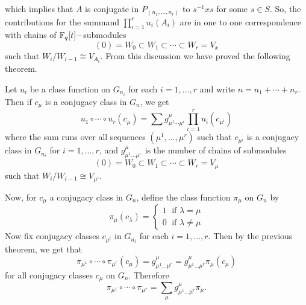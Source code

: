 which implies that $A$ is conjugate in $P_{(n_1,\dots,n_r)}$ to $s^{-1}xs$ for some $s\in S$. So, the contributions for the summand $\prod_{i=1}^ru_i(A_i)$ are in one to one correspondence with chains of $\mathbb{F}_q[t]-$submodules
\begin{equation}
    (0)=W_0\subset W_1\subset\cdots\subset W_r= V_x
\end{equation}
such that $W_i/W_{i-1}\cong V_{A_i}$. From this discussion we have proved the following theorem.
\begin{dang}
    \begin{theorem}\cite{macdonald1998symmetric}
        Let $u_i$ be a class function on $G_{n_i}$ for each $i=1,\dots,r$ and write $n=n_1+\cdots+n_r$. Then if $c_{\mu}$ is a conjugacy class in $G_n$, we get
        \begin{equation}
            u_1\circ\cdots\circ u_r(c_\mu)=\sum g_{\mu^1\cdots\mu^r}^\mu\prod_{i=1}^ru_i(c_{\mu^i})
        \end{equation}
        where the sum runs over all sequences $(\mu^1,\dots,\mu^r)$ such that $c_{\mu^i}$ is a conjugacy class in $G_{n_i}$ for $i=1,\dots,r$, and $g_{\mu^1\dots\mu^r}^\mu$ is the number of chains of submodules
        \begin{equation}
            (0)=W_0\subset W_1\subset\cdots\subset W_r= V_\mu
        \end{equation}
        such that $W_i/W_{i-1}\cong V_{\mu^i}$.
    \end{theorem}
\end{dang}
Now, for $c_\mu$ a conjugacy class in $G_n$, define the class function $\pi_\mu$ on $G_n$ by
\begin{equation}
    \pi_\mu(c_\lambda)=\left\{\begin{matrix}
        1 \;\text{ if }\lambda=\mu\\
        0 \;\text{ if }\lambda\neq \mu
    \end{matrix}\right.
\end{equation}
Now fix conjugacy classes $c_{\mu^i}$ in $G_{n_i}$ for each $i=1,\dots,r$. Then by the previous theorem, we get that
\begin{equation}
    \pi_{\mu^1}\circ\cdots\circ\pi_{\mu^r}(c_\mu)=g_{\mu^1\dots\mu^r}^\mu = g_{\mu^1\dots\mu^r}^\mu\pi_\mu(c_\mu)
\end{equation}
for all conjugacy classes $c_\mu$ on $G_n$. Therefore
\begin{equation}
    \pi_{\mu^1}\circ\cdots\circ\pi_{\mu^r}=\sum_\mu g_{\mu^1\dots\mu^r}^\mu\pi_\mu.
\end{equation}
